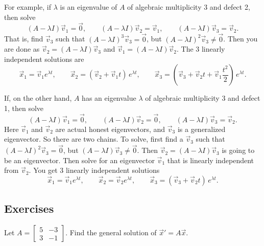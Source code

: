 For example, if $\lambda$ is an eigenvalue of $A$
of algebraic multiplicity 3 and defect 2, then solve
\begin{equation*}
(A - \lambda I) \vec{v}_1 = \vec{0} , \qquad
(A - \lambda I) \vec{v}_2 = \vec{v}_1 , \qquad
(A - \lambda I) \vec{v}_3 = \vec{v}_2 .
\end{equation*}
That is, find $\vec{v}_3$ such that 
${(A - \lambda I)}^3 \vec{v}_3 = \vec{0}$, but
${(A - \lambda I)}^2 \vec{v}_3 \not= \vec{0}$.
Then you are done as
$\vec{v}_2 = (A - \lambda I) \vec{v}_3$
and 
$\vec{v}_1 = (A - \lambda I) \vec{v}_2$.
The 3 linearly independent solutions are
\begin{equation*}
\vec{x}_1 = \vec{v}_1 e^{\lambda t} , \qquad
\vec{x}_2 = ( \vec{v}_2 + \vec{v}_1 t ) \, e^{\lambda t} , \qquad
\vec{x}_3 = \left( \vec{v}_3 + \vec{v}_2 t +
\vec{v}_{1} \frac{t^2}{2} \right) \, e^{\lambda t} .
\end{equation*}

If, on the other hand, $A$ has an eigenvalue $\lambda$
of algebraic multiplicity 3 and defect 1, then 
solve
\begin{equation*}
(A - \lambda I) \vec{v}_1 = \vec{0} , \qquad
(A - \lambda I) \vec{v}_2 = \vec{0} , \qquad
(A - \lambda I) \vec{v}_3 = \vec{v}_2 .
\end{equation*}
Here $\vec{v}_1$ and $\vec{v}_2$ are actual honest eigenvectors,
and $\vec{v}_3$ is a generalized eigenvector.
So there are two chains.
To solve, first find a 
$\vec{v}_3$ such that 
${(A - \lambda I)}^2 \vec{v}_3 = \vec{0}$, but
$(A - \lambda I) \vec{v}_3 \not= \vec{0}$.
Then $\vec{v}_2 = (A - \lambda I) \vec{v}_3$ is going to be an eigenvector.
Then solve for an eigenvector $\vec{v}_1$ that is linearly independent 
from $\vec{v}_2$.
You get 3 linearly independent solutions
\begin{equation*}
\vec{x}_1 = \vec{v}_1 e^{\lambda t} , \qquad
\vec{x}_2 = \vec{v}_2 e^{\lambda t} , \qquad
\vec{x}_3 = ( \vec{v}_3 + \vec{v}_2 t ) \, e^{\lambda t} .
\end{equation*}

\subsection{Exercises}

\begin{exercise}
Let
$A = \left[ \begin{smallmatrix} 5 & -3 \\ 3 & -1 \end{smallmatrix} \right]$.
Find the general solution of ${\vec{x}}' = A \vec{x}$.
\end{exercise}

